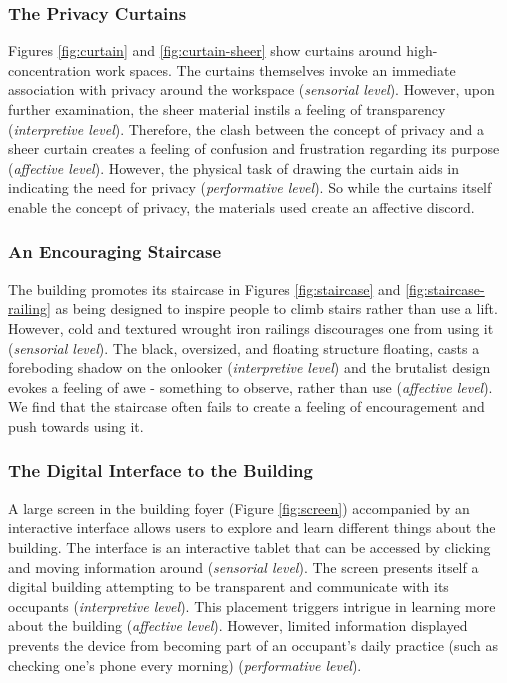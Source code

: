 \documentclass[manuscript, anonymous, review]{acmart}
\begin{document}
\subsubsection*{The Privacy Curtains}
Figures \ref{fig:curtain} and \ref{fig:curtain-sheer} show curtains around high-concentration work spaces. The curtains themselves invoke an immediate association with privacy around the workspace (\textit{sensorial level}). However, upon further examination, the sheer material instils a feeling of transparency (\textit{interpretive level}). Therefore, the clash between the concept of privacy and a sheer curtain creates a feeling of confusion and frustration regarding its purpose (\textit{affective level}). However, the physical task of drawing the curtain aids in indicating the need for privacy (\textit{performative level}). So while the curtains itself enable the concept of privacy, the materials used  create an affective discord. 

\subsubsection*{An Encouraging Staircase}
The building promotes its staircase in Figures \ref{fig:staircase} and \ref{fig:staircase-railing} as being designed to inspire people to climb stairs rather than use a lift. However, cold and textured wrought iron railings discourages one from using it (\textit{sensorial level}). The black, oversized, and floating structure floating, casts a foreboding  shadow on the onlooker  (\textit{interpretive level}) and the brutalist design evokes a feeling of awe - something to observe, rather than use (\textit{affective level}). We find that the staircase often fails to create a feeling of encouragement and push towards using it.

\subsubsection*{The Digital Interface to the Building}
A large screen in the building foyer (Figure \ref{fig:screen}) accompanied by an interactive interface allows users to explore and learn different things about the building. The interface is an interactive tablet that can be accessed by clicking and moving information around (\textit{sensorial level}). The screen presents itself a digital building attempting to be transparent and communicate with its occupants (\textit{interpretive level}). This placement triggers intrigue in learning more about the building (\textit{affective level}). However, limited information displayed prevents the device from becoming part of an occupant's daily practice (such as checking one's phone every morning) (\textit{performative level}). 
\end{document}
